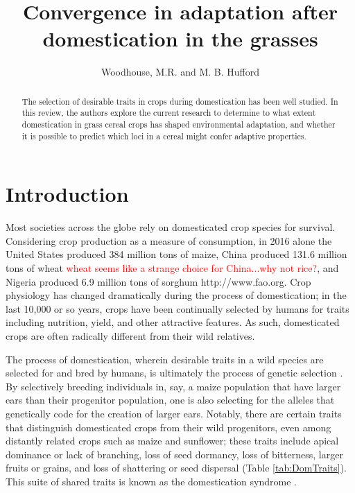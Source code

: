 \documentclass[12pt]{article}
\title{Convergence in adaptation after domestication in the grasses}
\author{Woodhouse, M.R. and M. B. Hufford}
\newcommand{\mbh}[1]{\textcolor{red}{\normalsize  #1}}
\begin{document}
\maketitle

\begin{abstract}
The selection of desirable traits in crops during domestication has been well studied. In this review, the authors explore the current research to determine to what extent domestication in grass cereal crops has shaped environmental adaptation, and whether it is possible to predict which loci in a cereal might confer adaptive properties.
\end{abstract}

\section*{Introduction}
Most societies across the globe rely on domesticated crop species for survival.
Considering crop production as a measure of consumption, in 2016 alone the United States produced 384 million tons of maize, China produced 131.6 million tons of wheat \mbh{wheat seems like a strange choice for China...why not rice?}, and Nigeria produced 6.9 million tons of sorghum http://www.fao.org.
Crop physiology has changed dramatically during the process of domestication; in the last 10,000 or so years, crops have been continually selected by humans for traits including nutrition, yield, and other attractive features.
As such, domesticated crops are often radically different from their wild relatives.

The process of domestication, wherein desirable traits in a wild species are selected for and bred by humans, is ultimately the process of genetic selection \citep{Doebley2006}.
By selectively breeding individuals in, say, a maize population that have larger ears than their progenitor population, one is also selecting for the alleles that genetically code for the creation of larger ears. 
Notably, there are certain traits that distinguish domesticated crops from their wild progenitors, even among distantly related crops such as maize and sunflower; these traits include apical dominance or lack of branching, loss of seed dormancy, loss of bitterness, larger fruits or grains, and loss of shattering or seed dispersal (Table \ref{tab:DomTraits}).
This suite of shared traits is known as the domestication syndrome \citep{Hammer1984}.
\end{document}
